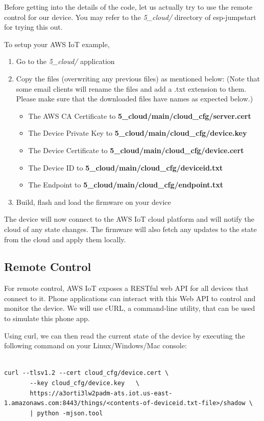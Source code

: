 \documentclass[main.tex]{subfiles}
\begin{document}
Before getting into the details of the code, let us actually try to use the remote control for our device.
You may refer to the \textit{5\_cloud/} directory of esp-jumpstart for trying this out.

To setup your AWS IoT example, 
\begin{enumerate}
    \item Go to the \textit{5\_cloud/} application
    \item Copy the files (overwriting any previous files) as mentioned below: (Note that some email clients will rename the files and add a .txt extension to them. Please make sure that the downloaded files have names as expected below.)
    \begin{itemize}
        \item The AWS CA Certificate to \textbf{5\_cloud/main/cloud\_cfg/server.cert}
        \item The Device Private Key to \textbf{5\_cloud/main/cloud\_cfg/device.key}
        \item The Device Certificate to \textbf{5\_cloud/main/cloud\_cfg/device.cert}
        \item The Device ID to \textbf{5\_cloud/main/cloud\_cfg/deviceid.txt}
        \item The Endpoint to \textbf{5\_cloud/main/cloud\_cfg/endpoint.txt}
    \end{itemize}
    \item Build, flash and load the firmware on your device
\end{enumerate}

The device will now connect to the AWS IoT cloud platform and will notify the cloud of any state changes. The firmware will also fetch any updates to the state from the cloud and apply them locally. 

\subsection{Remote Control}
For remote control, AWS IoT exposes a RESTful web API for all devices that connect to it. Phone applications can interact with this Web API to control and monitor the device. We will use cURL, a command-line utility, that can be used to simulate this phone app. 

Using curl, we can then read the current state of the device by executing the following command on your Linux/Windows/Mac console:
\begin{verbatim}

curl --tlsv1.2 --cert cloud_cfg/device.cert \
       --key cloud_cfg/device.key   \
       https://a3orti3lw2padm-ats.iot.us-east-1.amazonaws.com:8443/things/<contents-of-deviceid.txt-file>/shadow \ 
       | python -mjson.tool

\end{verbatim}
\end{document}
